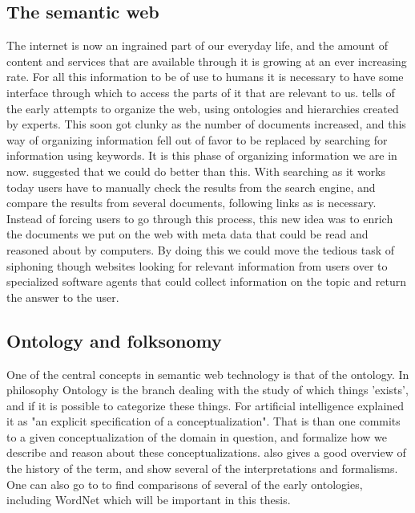 \subsection{The semantic web}
The internet is now an ingrained part of our everyday life, and the amount of content and services that are available through it is growing at an ever increasing rate. For all this information to be of use to humans it is necessary to have some interface through which to access the parts of it that are relevant to us. \citet{Shirky2007} tells of the early attempts to organize the web, using ontologies and hierarchies created by experts. This soon got clunky as the number of documents increased, and this way of organizing information fell out of favor to be replaced by searching for information using keywords. It is this phase of organizing information we are in now. 
\citet{Berners-Lee2001} suggested that we could do better than this. With searching as it works today users have to manually check the results from the search engine, and compare the results from several documents, following links as is necessary. Instead of forcing users to go through this process, this new idea was to enrich the documents we put on the web with meta data that could be read and reasoned about by computers. By doing this we could move the tedious task of siphoning though websites looking for relevant information from users over to specialized software agents that could collect information on the topic and return the answer to the user.

\subsection{Ontology and folksonomy}
One of the central concepts in semantic web technology is that of the ontology. 
In philosophy Ontology is the branch dealing with the study of which things 'exists', and if it is possible to categorize these things. 
For artificial intelligence \citet{Gruber1993} explained it as "an explicit specification of a conceptualization". 
That is than one commits to a given conceptualization of the domain in question, and formalize how we describe and reason about these conceptualizations. 
\citet{Pretorius2004} also gives a good overview of the history of the term, and show several of the interpretations and formalisms. 
One can also go to \citet{Noy1997} to find comparisons of several of the early ontologies, including WordNet which will be important in this thesis.

